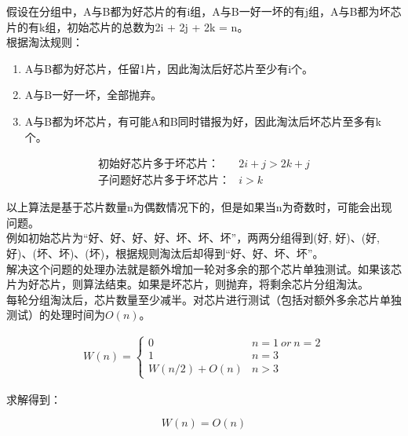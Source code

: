 假设在分组中，A与B都为好芯片的有i组，A与B一好一坏的有j组，A与B都为坏芯片的有k组，初始芯片的总数为2i + 2j + 2k = n。\\

根据淘汰规则：

\begin{enumerate}
	\item A与B都为好芯片，任留1片，因此淘汰后好芯片至少有i个。

	\item A与B一好一坏，全部抛弃。

	\item A与B都为坏芯片，有可能A和B同时错报为好，因此淘汰后坏芯片至多有k个。
\end{enumerate}

\vspace{-1.5cm}

\begin{align*}
	\text{初始好芯片多于坏芯片：}   & 2i + j > 2k + j \\
	\text{子问题好芯片多于坏芯片：} & i > k
\end{align*}

以上算法是基于芯片数量n为偶数情况下的，但是如果当n为奇数时，可能会出现问题。\\

例如初始芯片为“好、好、好、好、坏、坏、坏”，两两分组得到(好, 好)、(好, 好)、(坏、坏)、(坏)，根据规则淘汰后却得到“好、好、坏、坏”。\\

解决这个问题的处理办法就是额外增加一轮对多余的那个芯片单独测试。如果该芯片为好芯片，则算法结束。如果是坏芯片，则抛弃，将剩余芯片分组淘汰。\\

每轮分组淘汰后，芯片数量至少减半。对芯片进行测试（包括对额外多余芯片单独测试）的处理时间为$ O(n) $。

\vspace{-0.5cm}

\begin{align*}
	W(n) = \begin{cases}
		0             & n = 1\ or\ n = 2 \\
		1             & n = 3            \\
		W(n/2) + O(n) & n > 3
	\end{cases}
\end{align*}

求解得到：

\vspace{-0.5cm}

$$
	W(n) = O(n)
$$

